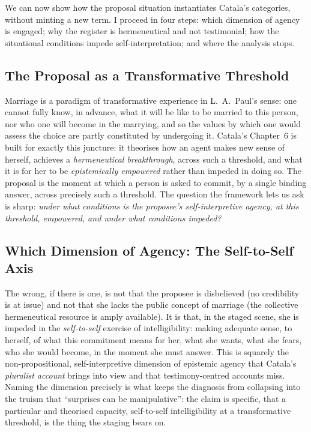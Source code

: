 \documentclass[11pt,a4paper]{article}
\begin{document}
We can now show how the proposal situation instantiates Catala's categories, without minting a new term. I proceed in four steps: which dimension of agency is engaged; why the register is hermeneutical and not testimonial; how the situational conditions impede self-interpretation; and where the analysis stops.

\subsection{The Proposal as a Transformative Threshold}\label{p06:sec:mapping}

Marriage is a paradigm of transformative experience in L.~A.\ Paul's sense: one cannot fully know, in advance, what it will be like to be married to this person, nor who one will become in the marrying, and so the values by which one would assess the choice are partly constituted by undergoing it. Catala's Chapter~6 is built for exactly this juncture: it theorises how an agent makes new sense of herself, achieves a \emph{hermeneutical breakthrough}, across such a threshold, and what it is for her to be \emph{epistemically empowered} rather than impeded in doing so. The proposal is the moment at which a person is asked to commit, by a single binding answer, across precisely such a threshold. The question the framework lets us ask is sharp: \emph{under what conditions is the proposee's self-interpretive agency, at this threshold, empowered, and under what conditions impeded?}

\subsection{Which Dimension of Agency: The Self-to-Self Axis}

The wrong, if there is one, is not that the proposee is disbelieved (no credibility is at issue) and not that she lacks the public concept of marriage (the collective hermeneutical resource is amply available). It is that, in the staged scene, she is impeded in the \emph{self-to-self} exercise of intelligibility: making adequate sense, to herself, of what this commitment means for her, what she wants, what she fears, who she would become, in the moment she must answer. This is squarely the non-propositional, self-interpretive dimension of epistemic agency that Catala's \emph{pluralist account} brings into view and that testimony-centred accounts miss. Naming the dimension precisely is what keeps the diagnosis from collapsing into the truism that ``surprises can be manipulative'': the claim is specific, that a particular and theorised capacity, self-to-self intelligibility at a transformative threshold, is the thing the staging bears on.
\end{document}
